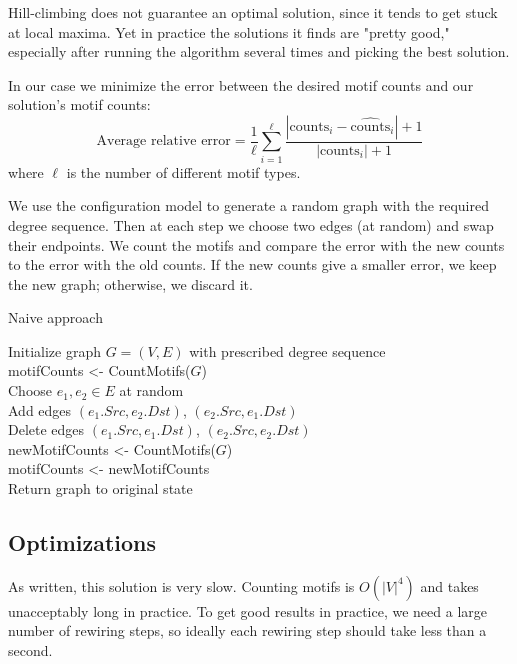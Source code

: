 Hill-climbing does not guarantee an optimal solution, since it tends to get stuck at local maxima.  Yet in practice the solutions it finds are "pretty good," especially after running the algorithm several times and picking the best solution.

In our case we minimize the error between the desired motif counts and our solution's motif counts:
\begin{equation}
\label{eqn:avgRelativeError}
\mbox{Average relative error} = \frac{1}{\ell} \sum_{i = 1}^{\ell} \frac{|\mbox{counts}_i - \widehat{\mbox{counts}}_i| + 1}{|\mbox{counts}_i| + 1}
\end{equation}
where $\ell$ is the number of different motif types.

We use the configuration model to generate a random graph with the required degree sequence.  Then at each step we choose two edges (at random) and swap their endpoints.  We count the motifs and compare the error with the new counts to the error with the old counts.  If the new counts give a smaller error, we keep the new graph; otherwise, we discard it.

\begin{algorithm}
\caption{Naive approach}
\label{algorithm:naive}
\begin{algorithmic}
Initialize graph $G = (V, E)$ with prescribed degree sequence\\
motifCounts <- CountMotifs($G$)\\
 {
	Choose $e_1, e_2 \in E$ at random\\
	Add edges $(e_1.Src, e_2.Dst)$, $(e_2.Src, e_1.Dst)$\\
	Delete edges $(e_1.Src, e_1.Dst)$, $(e_2.Src, e_2.Dst)$\\
	newMotifCounts <- CountMotifs($G$)\\
	 {
		motifCounts <- newMotifCounts\\
	} {
		Return graph to original state\\
	}
}

\end{algorithmic}
\end{algorithm}

\subsection{Optimizations}
As written, this solution is very slow.  Counting motifs is $O(|V|^4)$ and takes unacceptably long in practice.  To get good results in practice, we need a large number of rewiring steps, so ideally each rewiring step should take less than a second.

